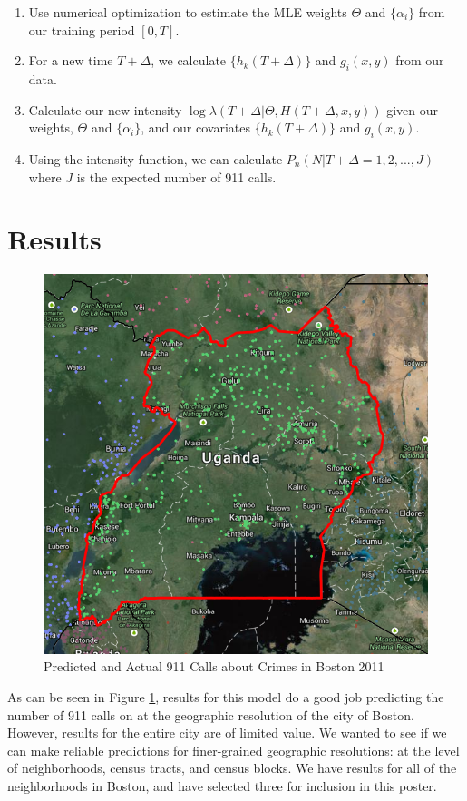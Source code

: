 \documentclass[a0,final]{a0poster}
\begin{document}
\begin{multicols}{3}
\begin{enumerate}
\item Use numerical optimization to estimate the MLE weights $\Theta$ and $\{\alpha_i\}$ from our training period $[0,T]$.
\item For a new time $T+\Delta$, we calculate $\{h_k(T+\Delta)\}$ and $g_i(x,y)$ from our data.
\item Calculate our new intensity $\log \lambda(T+\Delta|\Theta, H(T+\Delta, x, y))$ given our weights, $\Theta$ and $\{\alpha_i\}$, and our covariates $\{h_k(T+\Delta)\}$ and $g_i(x,y)$.
\item Using the intensity function, we can calculate $P_n(N|T+\Delta={1,2, ..., J})$ where $J$ is the expected number of 911 calls.
\end{enumerate}

\columnbreak


\section*{Results}
\begin{figure}[H]
\centering
\includegraphics[scale=0.75]{figs/uganda.png}
\caption{Predicted and Actual 911 Calls about Crimes in Boston 2011}
\label{bosgraph}
\end{figure}
As can be seen in Figure \ref{bosgraph}, results for this model do a good job predicting the number of 911 calls on at the geographic resolution of the city of Boston. However, results for the entire city are of limited value. We wanted to see if we can make reliable predictions for finer-grained geographic resolutions: at the level of neighborhoods, census tracts, and census blocks. We have results for all of the neighborhoods in Boston, and have selected three for inclusion in this poster.

\end{multicols}
\end{document}
